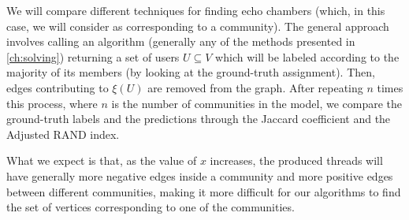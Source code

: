 We will compare different techniques for finding echo chambers (which,
in this case, we will consider as corresponding to a community). The general
approach involves calling an algorithm (generally any of the methods presented
in \autoref{ch:solving}) returning a set of users $U \subseteq V$ which will be
labeled according to the majority of its members (by looking at the
ground-truth assignment). Then, edges contributing to $\xi(U)$
are removed from the graph.  After repeating $n$ times this process, where $n$ is the number
of communities in the model, we compare the ground-truth labels and the
predictions through the Jaccard coefficient and the Adjusted RAND
index\footnotemark.


What we expect is that, as the value of $x$ increases, the produced threads
will have generally more negative edges inside a community and more positive
edges between different communities, making it more difficult for our
algorithms to find the set of vertices corresponding to one of the communities.

